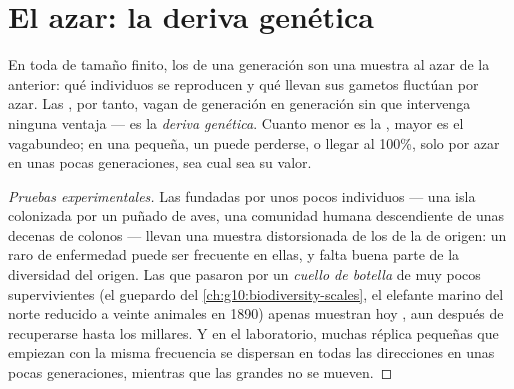 \section{El azar: la deriva genética}

\begin{proposition}\label{prop:g12:selection-drift-speciation:drift}
En toda  de tamaño finito, los  de una generación son
una muestra al azar de la anterior: qué individuos se reproducen y qué
 llevan sus gametos fluctúan por azar. Las ,
por tanto, vagan de generación en generación sin que intervenga ninguna
ventaja --- es la \emph{deriva genética}.
Cuanto menor es la , mayor es el vagabundeo; en una 
pequeña, un  puede perderse, o llegar al 100\%, solo por azar en
unas pocas generaciones, sea cual sea su valor.
\end{proposition}
\begin{proof}[Pruebas experimentales]
Las  fundadas por unos pocos individuos --- una isla
colonizada por un puñado de aves, una comunidad humana descendiente de
unas decenas de colonos --- llevan una muestra distorsionada de los
 de la  de origen: un  raro de enfermedad puede ser
frecuente en ellas, y falta buena parte de la diversidad del origen.
Las  que pasaron por un \emph{cuello de botella} de muy pocos
supervivientes (el guepardo del \cref{ch:g10:biodiversity-scales}, el
elefante marino del norte reducido a veinte animales en 1890) apenas
muestran hoy , aun después de recuperarse hasta los
millares. Y en el laboratorio, muchas  réplica pequeñas que
empiezan con la misma frecuencia se dispersan en todas las direcciones
en unas pocas generaciones, mientras que las grandes no se mueven.
\end{proof}

